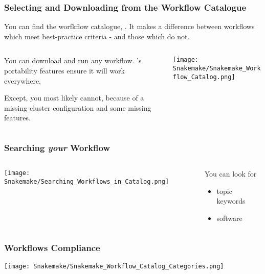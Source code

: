 \begin{frame}
 \frametitle{Selecting and Downloading from the Workflow Catalogue}
 You can find the \Snakemake{} worfkflow catalogue, . It makes a difference between workflows which meet best-practice criteria - and those which do not.\newline
 \begin{columns}
   \begin{column}{0.5\textwidth}
     You can download and run any workflow. \Snakemake's portability features ensure it will work everywhere.\pause
     \begin{warning}
     	Except, you most likely cannot, because of a missing cluster configuration and some missing features.
     \end{warning}
   \end{column}
   \begin{column}{0.5\textwidth}
     \texttt{[image: Snakemake/Snakemake\_Workflow\_Catalog.png]}
   \end{column}
 \end{columns}
\end{frame}

\begin{frame}
  \frametitle{Searching \emph{your} Workflow}
   \begin{columns}
  	\begin{column}{0.5\textwidth}
  		\texttt{[image: Snakemake/Searching\_Workflows\_in\_Catalog.png]}
  	\end{column}
  	\begin{column}{0.5\textwidth}
  		You can look for 
  		\begin{itemize}
  		  \item topic keywords
  		  \item software
  		\end{itemize}
  	\end{column}
  \end{columns}
\end{frame}

\begin{frame}
	\frametitle{Workflows Compliance}
	\begin{question}
	  \texttt{[image: Snakemake/Snakemake\_Workflow\_Catalog\_Categories.png]}
	\end{question}
\end{frame}

